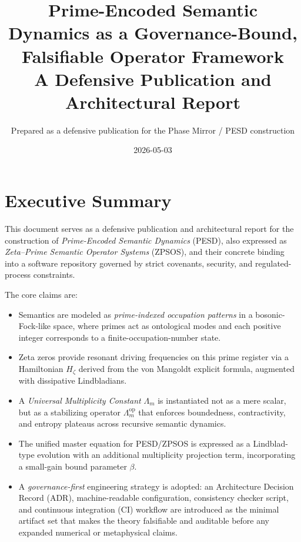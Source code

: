 \documentclass[11pt]{article}
\title{Prime-Encoded Semantic Dynamics as a Governance-Bound, Falsifiable Operator Framework\\[4pt]
{\large A Defensive Publication and Architectural Report}}
\author{Prepared as a defensive publication for the Phase Mirror / PESD construction}
\date{2026-05-03}
\begin{document}
\maketitle

\tableofcontents

\newpage

\section{Executive Summary}

This document serves as a defensive publication and architectural report for the construction of \emph{Prime-Encoded Semantic Dynamics} (PESD), also expressed as \emph{Zeta--Prime Semantic Operator Systems} (ZPSOS), and their concrete binding into a software repository governed by strict covenants, security, and regulated-process constraints.

The core claims are:

\begin{itemize}[nosep]
  \item Semantics are modeled as \emph{prime-indexed occupation patterns} in a bosonic-Fock-like space, where primes act as ontological modes and each positive integer corresponds to a finite-occupation-number state.
  \item Zeta zeros provide resonant driving frequencies on this prime register via a Hamiltonian \(H_\zeta\) derived from the von Mangoldt explicit formula, augmented with dissipative Lindbladians.
  \item A \emph{Universal Multiplicity Constant} \(\Lambda_m\) is instantiated not as a mere scalar, but as a stabilizing operator \(\Lambda_m^{\mathrm{op}}\) that enforces boundedness, contractivity, and entropy plateaus across recursive semantic dynamics.
  \item The unified master equation for PESD/ZPSOS is expressed as a Lindblad-type evolution with an additional multiplicity projection term, incorporating a small-gain bound parameter \(\beta\).
  \item A \emph{governance-first} engineering strategy is adopted: an Architecture Decision Record (ADR), machine-readable configuration, consistency checker script, and continuous integration (CI) workflow are introduced as the minimal artifact set that makes the theory falsifiable and auditable before any expanded numerical or metaphysical claims.
\end{itemize}
\end{document}
